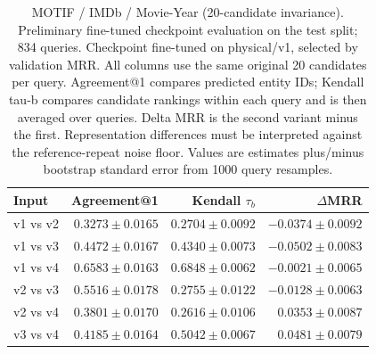 \begin{table}[t]
\centering
\small
\begin{tabular}{lrrr}
\toprule
Input & Agreement@1 & Kendall $\tau_b$ & $\Delta$MRR \\
\midrule
v1 vs v2 & $0.3273 \pm 0.0165$ & $0.2704 \pm 0.0092$ & $-0.0374 \pm 0.0092$ \\
v1 vs v3 & $0.4472 \pm 0.0167$ & $0.4340 \pm 0.0073$ & $-0.0502 \pm 0.0083$ \\
v1 vs v4 & $0.6583 \pm 0.0163$ & $0.6848 \pm 0.0062$ & $-0.0021 \pm 0.0065$ \\
v2 vs v3 & $0.5516 \pm 0.0178$ & $0.2755 \pm 0.0122$ & $-0.0128 \pm 0.0063$ \\
v2 vs v4 & $0.3801 \pm 0.0170$ & $0.2616 \pm 0.0106$ & $0.0353 \pm 0.0087$ \\
v3 vs v4 & $0.4185 \pm 0.0164$ & $0.5042 \pm 0.0067$ & $0.0481 \pm 0.0079$ \\
\bottomrule
\end{tabular}
\caption{MOTIF / IMDb / Movie-Year (20-candidate invariance). Preliminary fine-tuned checkpoint evaluation on the test split; 834 queries. Checkpoint fine-tuned on physical/v1, selected by validation MRR. All columns use the same original 20 candidates per query. Agreement@1 compares predicted entity IDs; Kendall tau-b compares candidate rankings within each query and is then averaged over queries. Delta MRR is the second variant minus the first. Representation differences must be interpreted against the reference-repeat noise floor. Values are estimates plus/minus bootstrap standard error from 1000 query resamples.}
\label{tab:motif-movie_year-invariance}
\end{table}

